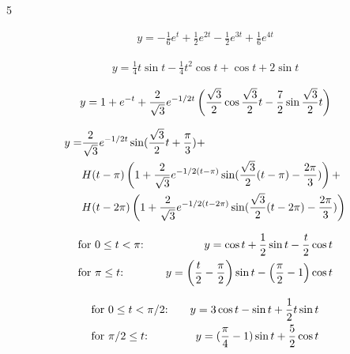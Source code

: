 \begin{vv286_ms}{5}
 \item[(i)]
   \begin{align*}
     y=-\frac{1}{6}e^t+\frac{1}{2}e^{2t}-\frac{1}{2}e^{3t}+\frac{1}{6}e^{4t}
   \end{align*}
  \item[(ii)]
    \begin{align*}
      y=\frac{1}{4}t\sin t-\frac{1}{4}t^2\cos t+\cos t+2\sin t
    \end{align*}
     \item[(iii)]
    \begin{align*}
      y=1+e^{-t}+\frac{2}{\sqrt{3}}e^{-1/2t}\left(\frac{\sqrt{3}}{2}\cos\frac{\sqrt{3}}{2}t-\frac{7}{2}\sin\frac{\sqrt{3}}{2}t\right)
    \end{align*}
   \item[(iv)]
     \begin{align*}
       y=&\frac{2}{\sqrt{3}}e^{-1/2t}\sin(\frac{\sqrt{3}}{2}t+\frac{\pi}{3})+\\
       &H(t-\pi)\left(1+\frac{2}{\sqrt{3}}e^{-1/2(t-\pi)}\sin(\frac{\sqrt{3}}{2}(t-\pi)-\frac{2\pi}{3})\right)+\\
       &H(t-2\pi)\left(1+\frac{2}{\sqrt{3}}e^{-1/2(t-2\pi)}\sin(\frac{\sqrt{3}}{2}(t-2\pi)-\frac{2\pi}{3})\right)
     \end{align*}
   \item[(v)]
     \begin{align*}
       &\text{for $0\le t<\pi$:}\quad&y=\cos t+\frac{1}{2}\sin t-\frac{t}{2}\cos t\\
       &\text{for $\pi\le t$:}\quad&y=\left(\frac{t}{2}-\frac{\pi}{2}\right)\sin t-\left(\frac{\pi}{2}-1\right)\cos t
     \end{align*}
    \item[(vi)]
      \begin{align*}
	&\text{for $0\le t<\pi/2$:}\quad&y=3\cos t-\sin t+\frac{1}{2}t\sin t\\
       &\text{for $\pi/2\le t$:}\quad&y=(\frac{\pi}{4}-1)\sin t+\frac{5}{2}\cos t
         \end{align*}
 \end{vv286_ms}


